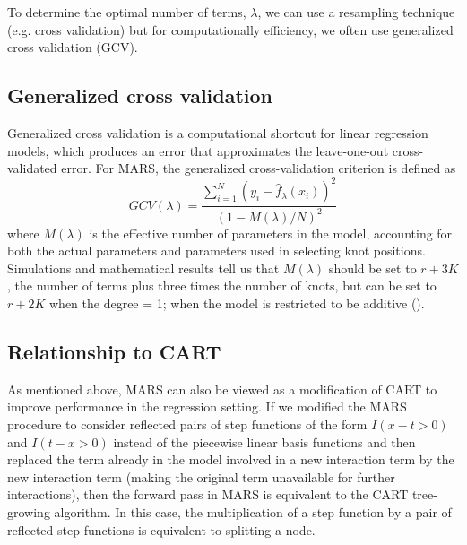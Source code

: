 \documentclass[12pt]{article}
\begin{document}
To determine the optimal number of terms, $\lambda$, we can use a resampling technique (e.g. cross validation) but for computationally efficiency, we often use generalized cross validation (GCV).


\subsection{Generalized cross validation} %
\label{sub:generalized_cross_validation}

Generalized cross validation is a computational shortcut for linear regression models, which produces an error that approximates the leave-one-out cross-validated error. For MARS, the generalized cross-validation criterion is defined as
\begin{equation}
  GCV(\lambda) =
    \frac{
      \sum_{i = 1}^{N}(y_{i} - \hat{f}_{\lambda}(x_{i}))^2
    }{
      (1 - M(\lambda)/N)^2
    }
\end{equation}
where $M(\lambda)$ is the effective number of parameters in the model, accounting for both the actual parameters and parameters used in selecting knot positions. Simulations and mathematical results tell us that $M(\lambda)$ should be set to $r + 3K$, the number of terms plus three times the number of knots, but can be set to $r + 2K$ when the degree = 1; when the model is restricted to be additive (\cite{esl}).


\subsection{Relationship to CART} %
\label{sub:relationship_to_cart}

As mentioned above, MARS can also be viewed as a modification of CART to improve performance in the regression setting. If we modified the MARS procedure to consider reflected pairs of step functions of the form $I(x - t > 0)$ and $I(t - x > 0)$ instead of the piecewise linear basis functions and then replaced the term already in the model involved in a new interaction term by the new interaction term (making the original term unavailable for further interactions), then the forward pass in MARS is equivalent to the CART tree-growing algorithm. In this case, the multiplication of a step function by a pair of reflected step functions is equivalent to splitting a node.
\end{document}
